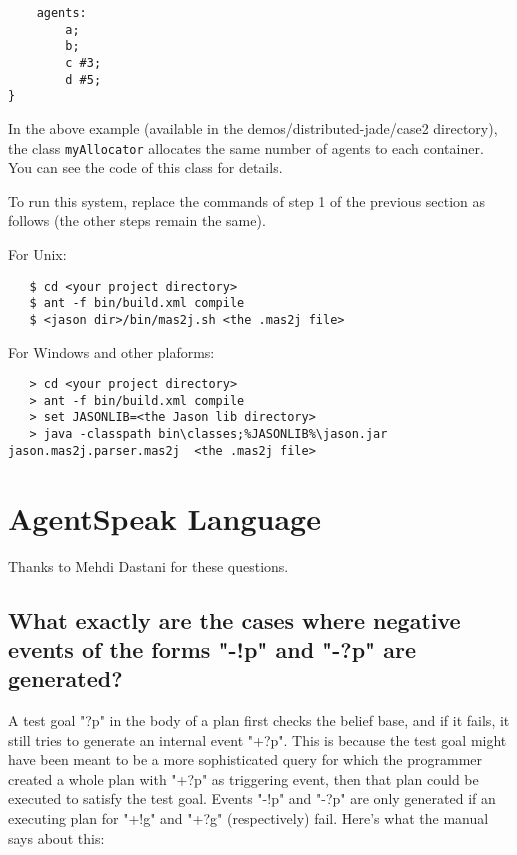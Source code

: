 \documentclass{article}
\newcommand{\jason}[0]{\htlink{\textit{Jason}}{http://jason.sf.net}\xspace}
\begin{document}
\begin{description}
\begin{verbatim}
    agents:
        a; 
        b;   
        c #3; 
        d #5;
}
\end{verbatim}

In the above example (available in the demos/distributed-jade/case2
directory), the class \texttt{myAllocator} allocates the same number
of agents to each container. You can see the code of this class for
details.

To run this system, replace the commands of step 1 of the previous
section as follows (the other steps remain the same).

For Unix:
\begin{verbatim}
   $ cd <your project directory>
   $ ant -f bin/build.xml compile
   $ <jason dir>/bin/mas2j.sh <the .mas2j file>
\end{verbatim}

For Windows and other plaforms:
\begin{verbatim}
   > cd <your project directory>
   > ant -f bin/build.xml compile
   > set JASONLIB=<the Jason lib directory>
   > java -classpath bin\classes;%JASONLIB%\jason.jar jason.mas2j.parser.mas2j  <the .mas2j file>
\end{verbatim}



\section{AgentSpeak Language}

Thanks to Mehdi Dastani for these questions.

\subsection{What exactly are the cases where negative events of the forms
  "-!p" and "-?p" are generated?}

A test goal "?p" in the body of a plan first checks the belief base,
and if it fails, it still tries to generate an internal event
"+?p". This is because the test goal might have been meant to be a
more sophisticated query for which the programmer created a whole plan
with "+?p" as triggering event, then that plan could be executed to
satisfy the test goal. Events "-!p" and "-?p" are only generated if an
executing plan for "+!g" and "+?g" (respectively) fail. Here's what
the manual says about this:


\end{description}
\end{document}
